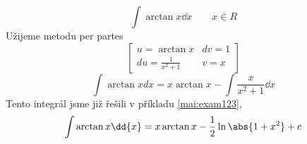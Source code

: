 \begin{mdframed}[style=mdexam]
  \begin{example}\label{mai:exam113}
    \begin{equation}\label{mai:exam016_002}
      \int{\arctan x\dd{x}}\qquad x\in R
    \end{equation}
    Užijeme metodu per partes 
    \begin{equation*}
      \left[
        \begin{array}{cc} 
           u =\arctan x                     &  dv= 1  \\ 
          du =\displaystyle\frac{1}{x^2+1}  &   v= x
        \end{array}
      \right]    
    \end{equation*}       
    \begin{equation*}
       \int{\arctan xdx} = x\arctan x-\int\frac{x}{x^2+1}\dd{x}
    \end{equation*}
    Tento integrál jsme již řešili v příkladu \ref{mai:exam123}, 
    \begin{equation*}
      \int{\arctan x\dd{x}} = x\arctan x-\frac{1}{2}\ln\abs{1+x^2}+ c                                 \\
    \end{equation*}
  \end{example}
\end{mdframed}